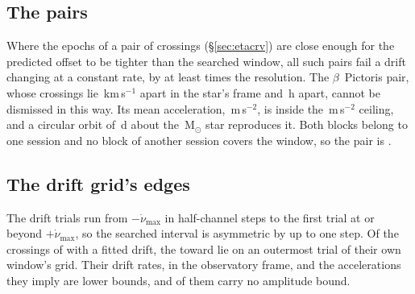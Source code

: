 \subsection{The pairs}
\label{sec:pairacct}

Where the epochs of a pair of crossings (\S\ref{sec:etacrv}) are close
enough for the predicted offset to be tighter than the searched window, all
\TjNPower{} such pairs fail a drift changing at a constant rate, by at least
\TjSigMin{} times the resolution. The $\beta$~Pictoris pair, whose crossings
lie \TjBpDvKms\,km\,s$^{-1}$ apart in the star's frame and \TjBpDtH\,h apart,
cannot be dismissed in this way. Its mean acceleration,
\TjBpAccelReq\,m\,s$^{-2}$, is inside the \WdAGrid\,m\,s$^{-2}$ ceiling, and
a circular orbit of \ObDayBp\,d about the \EcMassBp\,M$_\odot$ star
\citep{Crifo1997} reproduces it. Both blocks belong to one session and no
block of another session covers the window, so the pair is \TjBpVerdict.

\subsection{The drift grid's edges}
\label{sec:edge}

The drift trials run from $-\dot\nu_{\max}$ in half-channel steps to the
first trial at or beyond $+\dot\nu_{\max}$, so the searched interval is
asymmetric by up to one step. Of the \EgNDrift{} crossings of \EgDriftPop{}
with a fitted drift, the \EgNEdge{} toward \EgEdgeStars{} lie on an
outermost trial of their own window's grid. Their drift rates, in the
observatory frame, and the accelerations they imply are lower bounds, and
\EgNEdgeOut{} of them carry no amplitude bound.
